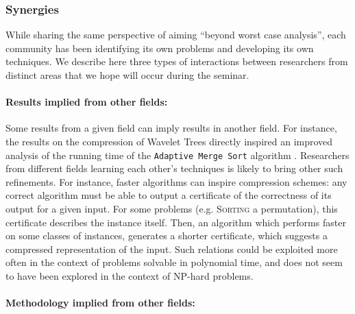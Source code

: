 \documentclass[a4paper,10pt]{article}
\begin{document}
\subsubsection{Synergies}
\label{sec:synergies}

While sharing the same perspective of aiming ``beyond worst case analysis'', each community has been identifying its own problems and developing its own techniques. We describe here three types of interactions between researchers from distinct areas that we hope will occur during the seminar.

\paragraph{Results implied from other fields:}

Some results from a given field can imply results in another field. 
%
For instance, the results on the compression of Wavelet Trees directly inspired an improved analysis of the running time of the \texttt{Adaptive Merge Sort} algorithm \cite{2013-TCS-CompressedRepresentationsOfPermutationsAndApplications-BarbayNavarro}.  
%
Researchers from different fields learning each other's techniques is likely to bring other such refinements.
%
For instance, faster algorithms can inspire compression schemes: any correct algorithm must be able to output a certificate of the correctness of its output for a given input. For some problems (e.g. \textsc{Sorting} a permutation), this certificate describes the instance itself. Then, an algorithm which performs faster on some classes of instances, generates a shorter certificate, which suggests a compressed representation of the input.
% 
Such relations could be exploited more often in the context of problems solvable in polynomial time, and does not seem to have been explored in the context of NP-hard problems.

\paragraph{Methodology implied from other fields:}
\end{document}
